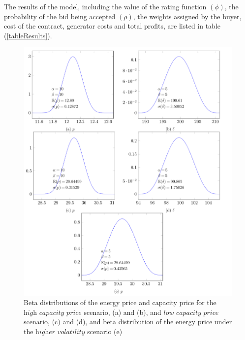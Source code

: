 \documentclass[informs]{informs3}
\begin{document}
The results of the model, including the value of the rating function $(\phi)$, the probability of the bid being accepted $(\rho)$, the weights assigned by the buyer, cost of the contract, generator costs and total profits, are listed in table (\ref{tableResults}).
\begin{figure}
	\centering 
	\includegraphics[scale=1]{figure2.png}
    \caption{Beta distributions of the energy price and capacity price for the $\textit{high capacity price}$ scenario, (a) and (b), and $\textit{low capacity price}$ scenario, (c) and (d), and beta distribution of the energy price under the $\textit{higher volatility} $ scenario (e)}
    \label{figBetaPrices}
\end{figure}
\end{document}
